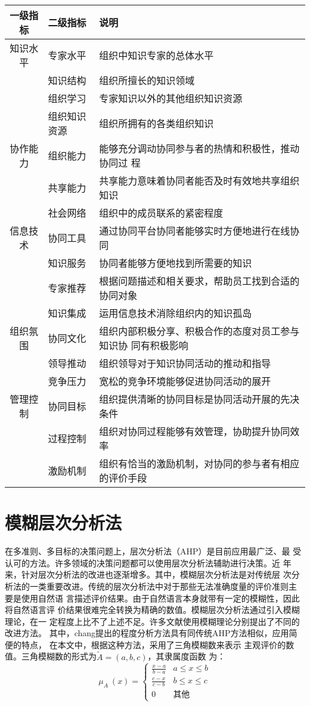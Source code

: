 \documentclass[winfonts,UTF8]{ctexart}
\begin{document}
  \begin{supertabular}[center]{clp{6.5cm}}
\hline
    一级指标&二级指标&说明\\\hline
    知识水平&专家水平&组织中知识专家的总体水平\\
          &知识结构&组织所擅长的知识领域    \\
          &组织学习&专家知识以外的其他组织知识资源\\
          &组织知识资源&组织所拥有的各类组织知识 \\
    协作能力&组织能力&能够充分调动协同参与者的热情和积极性，推动协同过
    程 \\
          &共享能力&共享能力意味着协同者能否及时有效地共享组织知识\\
          &社会网络&组织中的成员联系的紧密程度\\
    信息技术&协同工具&通过协同平台协同者能够实时方便地进行在线协同\\
          &知识服务&协同者能够方便地找到所需要的知识\\
          &专家推荐&根据问题描述和相关要求，帮助员工找到合适的协同对象\\
          &知识集成&运用信息技术消除组织内的知识孤岛\\
    组织氛围&协同文化&组织内部积极分享、积极合作的态度对员工参与知识协
    同有积极影响\\
          &领导推动&组织领导对于知识协同活动的推动和指导\\
          &竞争压力&宽松的竞争环境能够促进协同活动的展开\\
    管理控制&协同目标&组织提供清晰的协同目标是协同活动开展的先决条件\\
          &过程控制&组织对协同过程能够有效管理，协助提升协同效率\\
          &激励机制&组织有恰当的激励机制，对协同的参与者有相应的评价手段\\\hline
  \end{supertabular}

  \section{模糊层次分析法}

  在多准则、多目标的决策问题上，层次分析法（AHP）是目前应用最广泛、最
  受认可的方法。许多领域的决策问题都可以使用层次分析法辅助进行决策。近
  年来，针对层次分析法的改进也逐渐增多。其中，模糊层次分析法是对传统层
  次分析法的一类重要改进。传统的层次分析法中对于那些无法准确度量的评价准则主
  要是使用自然语
  言描述评价结果。由于自然语言本身就带有一定的模糊性，因此将自然语言评
  价结果很难完全转换为精确的数值。模糊层次分析法通过引入模糊理论，在一
  定程度上比不了上述不足。许多文献使用模糊理论分别提出了不同的改进方法。
  其中，chang提出的程度分析方法具有同传统AHP方法相似，应用简便的特点，
  在本文中，根据这种方法，采用了三角模糊数来表示
  主观评价的数值。三角模糊数的形式为$\tilde{A}=(a,b,c)$，其隶属度函数
  为：
  \[
  \mu_A~(x)=
  \left\{
      \begin{array}{ll}
        \frac{x-a}{b-a}&a\leq x \leq b\\
        \frac{c-x}{c-b}&b \leq x \leq c\\
        0 &　 \text{其他}
      \end{array}
    \right.
\]
\end{document}
